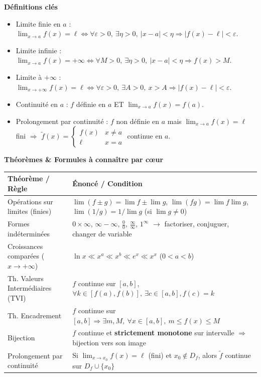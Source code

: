 \documentclass[11pt]{article}
\newcommand{\cle}[1]{{\popxbold\color{popdark}#1}}
\begin{document}
\begin{bilan}

\textbf{Définitions clés}
\begin{itemize}
  \item \cle{Limite finie en $a$} : $\lim_{x\to a}f(x)=\ell \iff \forall \varepsilon>0,\ \exists \eta>0,\ |x-a|<\eta \Rightarrow |f(x)-\ell|<\varepsilon$.
  \item \cle{Limite infinie} : $\lim_{x\to a}f(x)=+\infty \iff \forall M>0,\ \exists \eta>0,\ |x-a|<\eta \Rightarrow f(x)>M$.
  \item \cle{Limite à $+\infty$} : $\lim_{x\to +\infty}f(x)=\ell \iff \forall \varepsilon>0,\ \exists A>0,\ x>A \Rightarrow |f(x)-\ell|<\varepsilon$.
  \item \cle{Continuité en $a$} : $f$ définie en $a$ ET $\lim_{x\to a}f(x)=f(a)$.
  \item \cle{Prolongement par continuité} : $f$ non définie en $a$ mais $\lim_{x\to a}f(x)=\ell$ fini $\Rightarrow$ $\tilde f(x)=\begin{cases}f(x)&x\neq a\\ \ell&x=a\end{cases}$ continue en $a$.
\end{itemize}

\textbf{Théorèmes \& Formules à connaître par cœur}
\begin{center}
\begin{tabularx}{\linewidth}{|l|X|}\hline
\rowcolor{popblueL} \textbf{Théorème / Règle} & \textbf{Énoncé / Condition} \\ \hline
Opérations sur limites (finies) & $\lim(f\pm g)=\lim f\pm\lim g$, $\lim(fg)=\lim f\lim g$, $\lim(1/g)=1/\lim g$ (si $\lim g\neq0$) \\ \hline
Formes indéterminées & $0\times\infty$, $\infty-\infty$, $\frac{0}{0}$, $\frac{\infty}{\infty}$, $1^\infty$ $\rightarrow$ factoriser, conjuguer, changer de variable \\ \hline
Croissances comparées ($x\to+\infty$) & $\ln x \ll x^a \ll x^b \ll e^x \ll x^x$ ($0<a<b$) \\ \hline
Th. Valeurs Intermédiaires (TVI) & $f$ continue sur $[a,b]$, $\forall k\in[f(a),f(b)],\ \exists c\in[a,b], f(c)=k$ \\ \hline
Th. Encadrement & $f$ continue sur $[a,b] \Rightarrow \exists m,M,\ \forall x\in[a,b],\ m\le f(x)\le M$ \\ \hline
Bijection & $f$ continue et \textbf{strictement monotone} sur intervalle $\Rightarrow$ bijection vers son image \\ \hline
Prolongement par continuité & Si $\lim_{x\to x_0}f(x)=\ell$ (fini) et $x_0\notin D_f$, alors $\tilde f$ continue sur $D_f\cup\{x_0\}$ \\ \hline
\end{tabularx}
\end{center}


\end{bilan}
\end{document}
